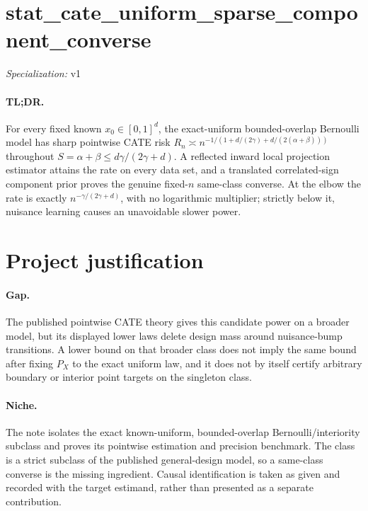 \documentclass{article}
\begin{document}
\sloppy

\section*{stat\_\allowbreak{}cate\_\allowbreak{}uniform\_\allowbreak{}sparse\_\allowbreak{}component\_\allowbreak{}converse}

\noindent\textit{Specialization:} v1\par

\paragraph{TL;DR.} For every fixed known \(x_0\in[0,1]^d\), the exact-uniform bounded-overlap Bernoulli model has sharp pointwise CATE risk \(R_n\asymp n^{-1/(1+d/(2\gamma)+d/(2(\alpha+\beta)))}\) throughout \(S=\alpha+\beta\le d\gamma/(2\gamma+d)\). A reflected inward local projection estimator attains the rate on every data set, and a translated correlated-sign component prior proves the genuine fixed-\(n\) same-class converse. At the elbow the rate is exactly \(n^{-\gamma/(2\gamma+d)}\), with no logarithmic multiplier; strictly below it, nuisance learning causes an unavoidable slower power.

\section{Project justification}

\paragraph{Gap.} The published pointwise CATE theory gives this candidate power on a broader model, but its displayed lower laws delete design mass around nuisance-bump transitions. A lower bound on that broader class does not imply the same bound after fixing \(P_X\) to the exact uniform law, and it does not by itself certify arbitrary boundary or interior point targets on the singleton class.

\paragraph{Niche.} The note isolates the exact known-uniform, bounded-overlap Bernoulli/interiority subclass and proves its pointwise estimation and precision benchmark. The class is a strict subclass of the published general-design model, so a same-class converse is the missing ingredient. Causal identification is taken as given and recorded with the target estimand, rather than presented as a separate contribution.
\end{document}
